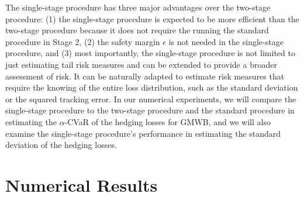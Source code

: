 The single-stage procedure has three major advantages over the two-stage procedure:
(1) the single-stage procedure is expected to be more efficient than the two-stage procedure because it does not require the running the standard procedure in Stage 2, 
(2) the safety margin $\epsilon$ is not needed in the single-stage procedure, and
(3) most importantly, the single-stage procedure is not limited to just estimating tail risk measures and can be extended to provide a broader assessment of risk. 
It can be naturally adapted to estimate risk measures that require the knowing of the entire loss distribution, such as the standard deviation or the squared tracking error.
In our numerical experiments, we will compare the single-stage procedure to the two-stage procedure and the standard procedure in estimating the $\alpha$-CVaR of the hedging losses for GMWB, and we will also examine the single-stage procedure's performance in estimating the standard deviation of the hedging losses.


\section{Numerical Results} \label{sec2:numerical}

